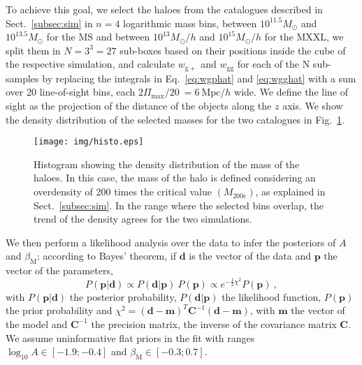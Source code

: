 \documentclass[a4paper,11pt]{article}
\begin{document}
To achieve this goal, we select the haloes from the catalogues described in Sect.~\ref{subsec:sim} in $n = 4$ logarithmic mass bins, between $10^{11.5} M_{\odot}$ and $10^{13.5} M_{\odot}$ for the MS and between $10^{13} M_{\odot}/h$ and $10^{15} M_{\odot}/h$ for the MXXL, we split them in $N = 3^3 = 27$ sub-boxes based on their positions inside the cube of the respective simulation, and calculate $w_{\mathrm{g+}}$ and $w_{\mathrm{gg}}$ for each of the N sub-samples by replacing the integrals in Eq.~\ref{eq:wgphat} and \ref{eq:wgghat} with a sum over 20 line-of-sight bins, each $2\Pi_{\mathrm{max}}/ 20 \ = 6 \ \mbox{Mpc}/h$ wide. We define the line of sight as the projection of the distance of the objects along the $z$ axis. We show the density distribution of the selected masses for the two catalogues in Fig.~\ref{fig:histo}.
\begin{figure}
	\centerline{
	\texttt{[image: img/histo.eps]}}
	\caption{Histogram showing the density distribution of the mass of the haloes.
	In this case, the mass of the halo is defined considering an overdensity of 200 times the critical value $(M_{200\mathrm{c}})$, as explained in Sect.~\ref{subsec:sim}. In the range where the selected bins overlap, the trend of the density agrees for the two simulations.}
	\label{fig:histo}
\end{figure}

We then perform a likelihood analysis over the data to infer the posteriors of $A$ and $\beta_{\mathrm{M}}$: according to Bayes' theorem, if $\boldsymbol{d}$ is the vector of the data and $\boldsymbol{p}$ the vector of the parameters, 
\begin{equation}
    P(\boldsymbol{p} | \boldsymbol{d}) \propto P(\boldsymbol{d} | \boldsymbol{p}) \ P(\boldsymbol{p}) \propto e^{-\frac{1}{2} \chi ^2} P(\boldsymbol{p}) \ ,
	\label{eq:bayes}
\end{equation}
with $P(\boldsymbol{p} | \boldsymbol{d})$ the posterior probability, $P(\boldsymbol{d} | \boldsymbol{p})$ the likelihood function, $P(\boldsymbol{p})$ the prior probability and $\chi ^2 = (\boldsymbol{d} - \boldsymbol{m})^T \mathbf{C}^{-1} (\boldsymbol{d} - \boldsymbol{m})$, with $\boldsymbol{m}$ the vector of the model and $\mathbf{C}^{-1}$ the precision matrix, the inverse of the covariance matrix $\mathbf{C}$. We assume uninformative flat priors in the fit with ranges $\log_{10} A \in [-1.9;-0.4]$ and $\beta_{\mathrm{M}} \in [-0.3;0.7]$. 
\end{document}
